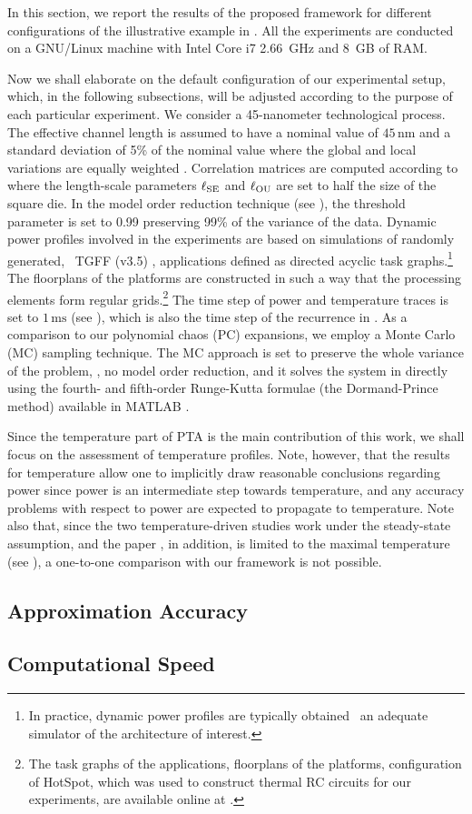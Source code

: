 
In this section, we report the results of the proposed framework for different configurations of the illustrative example in .
All the experiments are conducted on a GNU/Linux machine with Intel Core i7 2.66~GHz and 8~GB of RAM.

Now we shall elaborate on the default configuration of our experimental setup, which, in the following subsections, will be adjusted according to the purpose of each particular experiment.
We consider a 45-nanometer technological process.
The effective channel length is assumed to have a nominal value of $45\,\text{nm}$ and a standard deviation of 5\% of the nominal value where the global and local variations are equally weighted \cite{juan2011, juan2012}.
Correlation matrices are computed according to  where the length-scale parameters $\ell_{\text{SE}}$ and $\ell_{\text{OU}}$ are set to half the size of the square die.
In the model order reduction technique (see ), the threshold parameter is set to 0.99 preserving 99\% of the variance of the data.
Dynamic power profiles involved in the experiments are based on simulations of randomly generated, \via\ TGFF (v3.5) \cite{dick1998}, applications defined as directed acyclic task graphs.\footnote{In practice, dynamic power profiles are typically obtained \via\ an adequate simulator of the architecture of interest.}
The floorplans of the platforms are constructed in such a way that the processing elements form regular grids.\footnote{The task graphs of the applications, floorplans of the platforms, configuration of HotSpot, which was used to construct thermal RC circuits for our experiments, are available online at \cite{sources}.}
The time step of power and temperature traces is set to $1\,\text{ms}$ (see ), which is also the time step of the recurrence in .
As a comparison to our polynomial chaos (PC) expansions, we employ a Monte Carlo (MC) sampling technique.
The MC approach is set to preserve the whole variance of the problem, \ie, no model order reduction, and it solves the system in  directly using the fourth- and fifth-order Runge-Kutta formulae (the Dormand-Prince method) \cite{press2007} available in MATLAB \cite{matlab}.

Since the temperature part of PTA is the main contribution of this work, we shall focus on the assessment of temperature profiles.
Note, however, that the results for temperature allow one to implicitly draw reasonable conclusions regarding power since power is an intermediate step towards temperature, and any accuracy problems with respect to power are expected to propagate to temperature.
Note also that, since the two temperature-driven studies \cite{juan2011, juan2012} work under the steady-state assumption, and the paper \cite{juan2011}, in addition, is limited to the maximal temperature (see ), a one-to-one comparison with our framework is not possible.

\subsection{Approximation Accuracy} 


\subsection{Computational Speed} 

